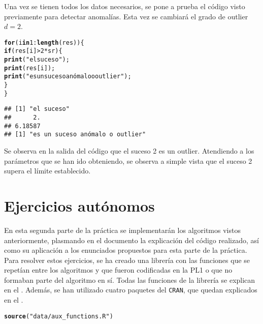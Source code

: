 \documentclass[12pt]{report}\usepackage[]{graphicx}\usepackage[dvipsnames]{xcolor}
\makeatletter
\newcommand{\hlnum}[1]{\textcolor[rgb]{0.686,0.059,0.569}{#1}}%
\newcommand{\hlstr}[1]{\textcolor[rgb]{0.192,0.494,0.8}{#1}}%
\newcommand{\hlopt}[1]{\textcolor[rgb]{0,0,0}{#1}}%
\newcommand{\hlstd}[1]{\textcolor[rgb]{0.345,0.345,0.345}{#1}}%
\newcommand{\hlkwa}[1]{\textcolor[rgb]{0.161,0.373,0.58}{\textbf{#1}}}%
\newcommand{\hlkwd}[1]{\textcolor[rgb]{0.737,0.353,0.396}{\textbf{#1}}}%
\newenvironment{kframe}{%
 \def\at@end@of@kframe{}%
 \ifinner\ifhmode%
  \def\at@end@of@kframe{\end{minipage}}%
  \begin{minipage}{\columnwidth}%
 \fi\fi%
 \def\FrameCommand##1{\hskip\@totalleftmargin \hskip-\fboxsep
 \colorbox{shadecolor}{##1}\hskip-\fboxsep
     \hskip-\linewidth \hskip-\@totalleftmargin \hskip\columnwidth}%
 \MakeFramed {\advance\hsize-\width
   \@totalleftmargin\z@ \linewidth\hsize
   \@setminipage}}%
 {\par\unskip\endMakeFramed%
 \at@end@of@kframe}
\newenvironment{knitrout}{}{} %
\makeatother
\begin{document}
			 Una vez se tienen todos los datos necesarios, se pone a prueba el código visto previamente para detectar anomalías. Esta vez se cambiará el grado de outlier $d = 2$.
			 
\begin{knitrout}
\color{fgcolor}\begin{kframe}
\begin{alltt}
\hlkwa{for} \hlstd{(i} \hlkwa{in} \hlnum{1}\hlopt{:}\hlkwd{length}\hlstd{(res)) \{}
        \hlkwa{if} \hlstd{(res[i]} \hlopt{>} \hlnum{2}\hlopt{*}\hlstd{sr) \{}
                \hlkwd{print}\hlstd{(}\hlstr{"el suceso"}\hlstd{);}
                \hlkwd{print}\hlstd{(res[i]);}
                \hlkwd{print}\hlstd{(}\hlstr{"es un suceso anómalo o outlier"}\hlstd{);}
        \hlstd{\}}
\hlstd{\}}
\end{alltt}
\begin{verbatim}
## [1] "el suceso"
##      2. 
## 6.18587 
## [1] "es un suceso anómalo o outlier"
\end{verbatim}
\end{kframe}
\end{knitrout}
			 
			 Se observa en la salida del código que el suceso 2 es un outlier. Atendiendo a los parámetros que se han ido obteniendo, se observa a simple vista que el suceso 2 supera el límite establecido. 
	 
	 \chapter{Ejercicios autónomos}
	 
		 En esta segunda parte de la práctica se implementarán los algoritmos vistos anteriormente, plasmando en el documento la explicación del código realizado, así como su aplicación a los enunciados propuestos para esta parte de la práctica. Para resolver estos ejercicios, se ha creado una librería con las funciones que se repetían entre los algoritmos y que fueron codificadas en la PL1 o que no formaban parte del algoritmo en sí. Todas las funciones de la librería se explican en el . Además, se han utilizado cuatro paquetes del \texttt{CRAN}, que quedan explicados en el . 
		 
\begin{knitrout}
\color{fgcolor}\begin{kframe}
\begin{alltt}
\hlkwd{source}\hlstd{(}\hlstr{"data/aux_functions.R"}\hlstd{)}
\end{alltt}
\end{kframe}
\end{knitrout}
		 
\end{document}
